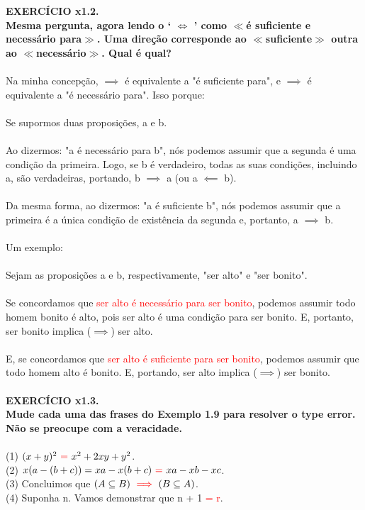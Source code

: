 \documentclass[a4paper, 12pt]{article}
\begin{document}
\noindent \textbf{EXERCÍCIO x1.2. \\
Mesma pergunta, agora lendo o ‘ $\iff$ ’ como $\ll$é suficiente e necessário para$\gg$. Uma direção corresponde ao  $\ll$suficiente$\gg$ outra ao  $\ll$necessário$\gg$. Qual é qual?} \\ \\
Na minha concepção, $\implies$ é equivalente a "é suficiente para", e $\implies$ é equivalente a "é necessário para". Isso porque: \\ \\
Se supormos duas proposições, a e b. \\ \\
Ao dizermos: "a é necessário para b", nós podemos assumir que a segunda é uma condição da primeira. Logo, se b é verdadeiro, todas as suas condições, incluindo a, são verdadeiras, portando, b $\implies$ a (ou a $\impliedby$ b). \\ \\
Da mesma forma, ao dizermos: "a é suficiente b", nós podemos assumir que a primeira é a única condição de existência da segunda e, portanto, a $\implies$ b. \\ \\
Um exemplo: \\ \\
Sejam as proposições a e b, respectivamente, "ser alto" e "ser bonito". \\ \\
Se concordamos que \textcolor{red}{ser alto é necessário para ser bonito}, podemos assumir todo homem bonito é alto, pois ser alto é uma condição para ser bonito. E, portanto, ser bonito implica ($\implies$) ser alto. \\ \\
E, se concordamos que \textcolor{red}{ser alto é suficiente para ser bonito}, podemos assumir que todo homem alto é bonito. E, portando, ser alto implica ($\implies$) ser bonito. \\ \\

\noindent \textbf{EXERCÍCIO x1.3. \\
Mude cada uma das frases do Exemplo 1.9 para resolver o type error. Não se preocupe
com a veracidade.} \\ \\
(1) $(x + y)^{2} \textcolor{red}{~=~} x^{2} + 2xy + y^{2}$. \\
(2) $x(a - (b + c)) = xa - x(b + c) \textcolor{red}{~=~} xa - xb - xc$. \\
(3) Concluimos que $(A \subseteq B) \textcolor{red}{~\implies~} (B \subseteq A)$. \\
(4) Suponha n. Vamos demonstrar que n + 1 \textcolor{red}{= r}. \\ \\
\end{document}
